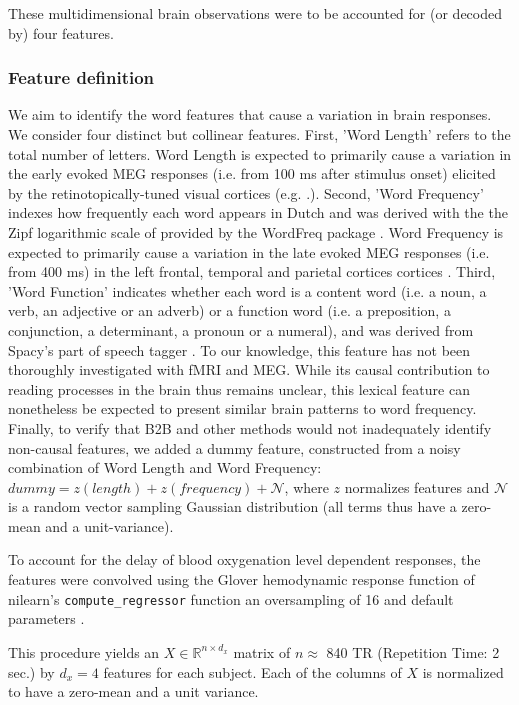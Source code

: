 These multidimensional brain observations were to be accounted for (or decoded by) four features.

\subsubsection{Feature definition}

We aim to identify the word features that cause a variation in brain responses. We consider four distinct but collinear features.
%
First, 'Word Length' refers to the total number of letters. Word Length is expected to primarily cause a variation in the early evoked MEG responses (i.e. from 100 ms after stimulus onset) elicited by the retinotopically-tuned visual cortices (e.g. \citep{pegado2014timing}.).
%
Second, 'Word Frequency' indexes how frequently each word appears in Dutch and
was derived with the the Zipf logarithmic scale of \citep{van2014subtlex}
provided by the WordFreq package \citep{speerwordfreq}. Word Frequency is
expected to primarily cause a variation in the late evoked MEG responses (i.e.
from 400 ms) in the left frontal, temporal and parietal cortices
cortices \citep{kutas2011thirty,mccandliss2003visual}.
%
Third, 'Word Function' indicates whether each word is a content word (i.e. a
noun, a verb, an adjective or an adverb) or a function word (i.e. a preposition,
a conjunction, a determinant, a pronoun or a numeral), and was derived from
Spacy's part of speech tagger \citep{spacy2}. To our knowledge, this feature has
not been thoroughly investigated with fMRI and MEG. While its causal contribution to
reading processes in the brain thus remains unclear, this lexical feature can
nonetheless be expected to present similar brain patterns to word frequency.
%
Finally, to verify that B2B and other methods would not inadequately identify non-causal features, we added a dummy feature, constructed from a noisy combination of Word Length and Word Frequency:
$dummy = z(length) + z(frequency) + \mathcal{N}$, where $z$ normalizes features
and $\mathcal{N}$ is a random vector sampling Gaussian distribution (all terms
thus have a zero-mean and a unit-variance).

To account for the delay of blood oxygenation level dependent responses, the
features were convolved using the Glover hemodynamic response function
of nilearn's \texttt{compute\_regressor} function an oversampling of 16 and default parameters \citep{nilearn}.

This procedure yields an $X \in \mathbb{R}^{n \times d_x}$ matrix of $n\approx$
840 TR (Repetition Time: 2 sec.) by
$d_x=4$ features for each subject. Each of the columns of $X$ is normalized to
have a zero-mean and a unit variance.


